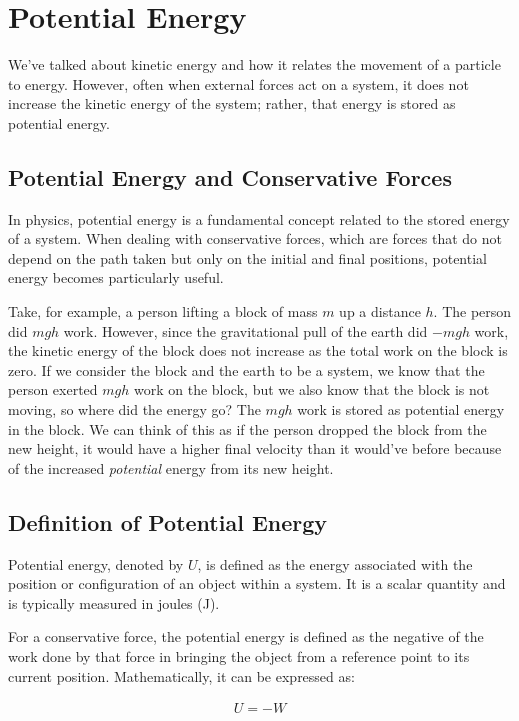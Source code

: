 \documentclass[11pt]{article}
\begin{document}
\section{Potential Energy}
We've talked about kinetic energy and how it relates the movement of a particle to energy. However, often when external forces act on a system, it does not increase the kinetic energy of the system; rather, that energy is stored as potential energy. 

\subsection{Potential Energy and Conservative Forces}

In physics, potential energy is a fundamental concept related to the stored energy of a system. When dealing with conservative forces, which are forces that do not depend on the path taken but only on the initial and final positions, potential energy becomes particularly useful.

Take, for example, a person lifting a block of mass $m$ up a distance $h$. The person did $mgh$ work. However, since the gravitational pull of the earth did $-mgh$ work, the kinetic energy of the block does not increase as the total work on the block is zero. If we consider the block and the earth to be a system, we know that the person exerted $mgh$ work on the block, but we also know that the block is not moving, so where did the energy go? The $mgh$ work is stored as potential energy in the block. We can think of this as if the person dropped the block from the new height, it would have a higher final velocity than it would've before because of the increased \textit{potential} energy from its new height.

\subsection{Definition of Potential Energy}

Potential energy, denoted by $U$, is defined as the energy associated with the position or configuration of an object within a system. It is a scalar quantity and is typically measured in joules (J).

For a conservative force, the potential energy is defined as the negative of the work done by that force in bringing the object from a reference point to its current position. Mathematically, it can be expressed as:

\begin{align*}
    U = -W
\end{align*}
\end{document}
